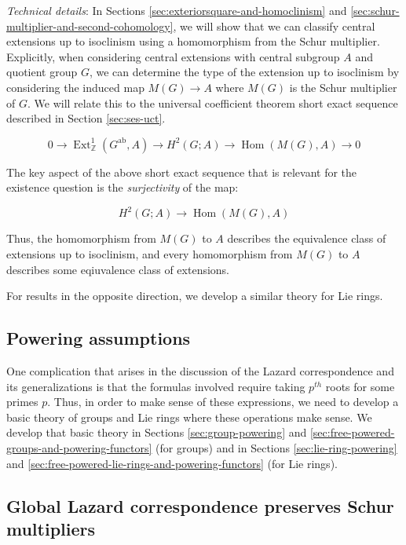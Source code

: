 {\em Technical details}: In Sections
\ref{sec:exteriorsquare-and-homoclinism} and
\ref{sec:schur-multiplier-and-second-cohomology}, we will show that we
can classify central extensions up to isoclinism using a homomorphism
from the Schur multiplier. Explicitly, when considering central
extensions with central subgroup $A$ and quotient group $G$, we can
determine the type of the extension up to isoclinism by considering
the induced map $M(G) \to A$ where $M(G)$ is the Schur multiplier of
$G$. We will relate this to the universal coefficient theorem short
exact sequence described in Section \ref{sec:ses-uct}.

\begin{equation*}
  0 \to \operatorname{Ext}^1_{\mathbb{Z}}(G^{\operatorname{ab}},A) \to H^2(G;A) \to \operatorname{Hom}(M(G),A) \to 0
\end{equation*}

The key aspect of the above short exact sequence that is relevant for
the existence question is the {\em surjectivity} of the map:

$$H^2(G;A) \to \operatorname{Hom}(M(G),A)$$

Thus, the homomorphism from $M(G)$ to $A$ describes the equivalence
class of extensions up to isoclinism, and every homomorphism from
$M(G)$ to $A$ describes some eqiuvalence class of extensions.

For results in the opposite direction, we develop a similar theory for
Lie rings.
\subsection{Powering assumptions}

One complication that arises in the discussion of the Lazard
correspondence and its generalizations is that the formulas involved
require taking $p^{th}$ roots for some primes $p$. Thus, in order to
make sense of these expressions, we need to develop a basic theory of
groups and Lie rings where these operations make sense. We develop
that basic theory in Sections \ref{sec:group-powering} and
\ref{sec:free-powered-groups-and-powering-functors} (for groups) and
in Sections \ref{sec:lie-ring-powering} and
\ref{sec:free-powered-lie-rings-and-powering-functors} (for Lie
rings).

\subsection{Global Lazard correspondence preserves Schur multipliers}

